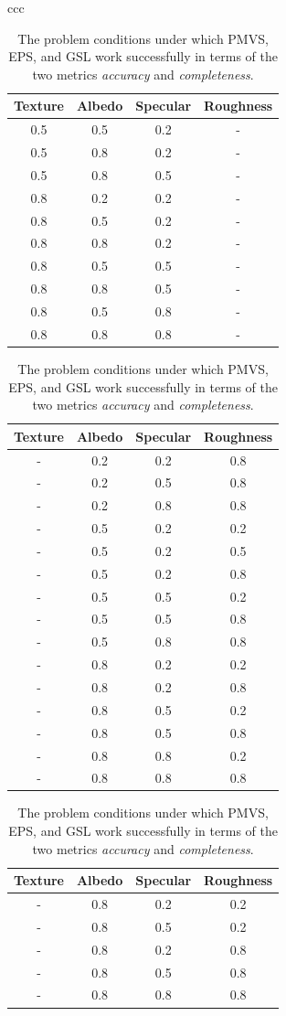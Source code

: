 \begin{table}
\centering
\begin{tabular}{ccc}
\begin{tabular}{*{4}{c}}
\toprule
Texture & Albedo & Specular & Roughness\\
\midrule
0.5 & 0.5 & 0.2 & -\\
0.5 & 0.8 & 0.2 & -\\
0.5 & 0.8 & 0.5 & -\\
0.8 & 0.2 & 0.2 & -\\
0.8 & 0.5 & 0.2 & -\\
0.8 & 0.8 & 0.2 & -\\
0.8 & 0.5 & 0.5 & -\\
0.8 & 0.8 & 0.5 & -\\
0.8 & 0.5 & 0.8 & -\\
0.8 & 0.8 & 0.8 & -\\
\bottomrule
\end{tabular}

\begin{tabular}{*{4}{c}}
\toprule
Texture & Albedo & Specular & Roughness\\
\midrule
- & 0.2 & 0.2 & 0.8\\
- & 0.2 & 0.5 & 0.8\\
- & 0.2 & 0.8 & 0.8\\
- & 0.5 & 0.2 & 0.2\\
- & 0.5 & 0.2 & 0.5\\
- & 0.5 & 0.2 & 0.8\\
- & 0.5 & 0.5 & 0.2\\
- & 0.5 & 0.5 & 0.8\\
- & 0.5 & 0.8 & 0.8\\
- & 0.8 & 0.2 & 0.2\\ %
- & 0.8 & 0.2 & 0.8\\
- & 0.8 & 0.5 & 0.2\\
- & 0.8 & 0.5 & 0.8\\
- & 0.8 & 0.8 & 0.2\\ %
- & 0.8 & 0.8 & 0.8\\
\bottomrule
\end{tabular}

\begin{tabular}{*{4}{c}}
\toprule
Texture & Albedo & Specular & Roughness\\
\midrule
- & 0.8 & 0.2 & 0.2\\
- & 0.8 & 0.5 & 0.2\\
- & 0.8 & 0.2 & 0.8\\
- & 0.8 & 0.5 & 0.8\\
- & 0.8 & 0.8 & 0.8\\
\bottomrule
\end{tabular}

\end{tabular}
\caption{The problem conditions under which PMVS, EPS, and GSL work successfully in terms of the two metrics \textit{accuracy} and \textit{completeness}.}
\label{tab:training_result}
\end{table}

